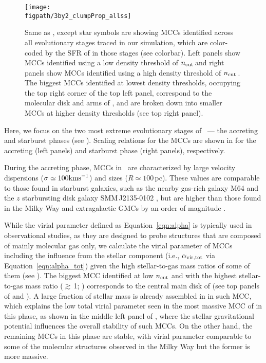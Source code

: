 \IfFileExists{emulateapjlegacy.cls}{\documentclass[iop]{emulateapjlegacy}}{\documentclass[iop]{emulateapj}}
\def\figpath{./Fig}
\begin{document}
\begin{figure*}
\centering
\texttt{[image: \\figpath/3by2\_clumpProp\_allss]}
\caption{Same as , except star symbols are showing MCCs identified across all evolutionary stages traced in our simulation, which are color-coded by the SFR of \flower in those stages (see colorbar). Left panels show MCCs identified using a low density threshold of $n_{\rm cut}$\,\cc and right panels show MCCs
identified using a high density threshold of $n_{\rm cut}$\,\cc.
The biggest MCCs identified at lowest density thresholds, occupying the top right corner of the top left panel, correspond to the molecular 
disk and arms of \flower, and are broken down into smaller MCCs at higher density thresholds (see top right panel).
\label{fig:alpha16-28}}
\end{figure*}


Here, we focus on the two most extreme evolutionary stages of \flower\ --- the accreting and starburst phases (see ). Scaling relations for the MCCs are shown in  for the accreting (left panels) and starburst phase (right panels), respectively.

During the accreting phase, MCCs in \flower\ are characterized by large velocity dispersions ($\sigma \simeq 100 {\rm km s}^{-1}$) and sizes ($R\simeq 100$\,pc). These values are comparable to those found in starburst galaxies, such as the nearby gas-rich galaxy M64 and the $z$ starbursting disk galaxy SMM\,J2135-0102 \citep{Rosolowsky05a, Swinbank11a}, but are higher than those found in the Milky Way and extragalactic GMCs by an order of magnitude \citep{Heyer04a, Bolatto08a}.

While the virial parameter defined as Equation~\ref{eqn:alpha} is typically used in observational studies, as they are designed to probe structures that are composed of mainly molecular gas only, we calculate the virial parameter of MCCs including the influence from the stellar component (i.e., $\alpha_{\rm vir, tot}$ via Equation~\ref{eqn:alpha_tot}) given the high stellar-to-gas mass ratios of some of them (see ).
% 
The biggest MCC identified at low $n_{\rm cut}$ and with the highest stellar-to-gas mass ratio ($\gtrsim$\,1; ) corresponds to the central main disk of \flower (see top panels of  and ). A large fraction of stellar mass is already assembled in \flower in such MCC, which explains the low total virial parameter seen in the most massive MCC of \flower in this phase, as shown in the middle left panel of , where the stellar gravitational potential influences the overall stability of such MCCs. On the other hand, the  remaining MCCs in this phase are stable, with virial parameter comparable to some of the molecular structures observed in the Milky Way but the former is more massive.
\end{document}

